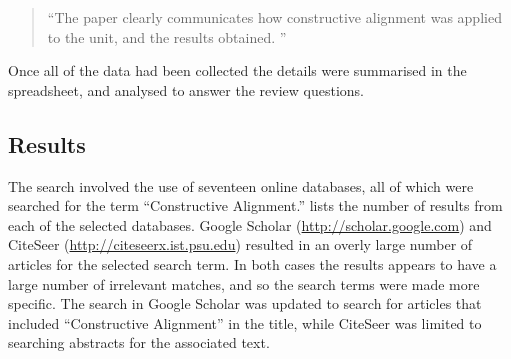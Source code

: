 \begin{quote}
``The paper clearly communicates how constructive alignment was applied to the unit, and the results obtained. ''	
\end{quote}

Once all of the data had been collected the details were summarised in the spreadsheet, and analysed to answer the review questions.



\clearpage
\subsection{Results} %
\label{sub:review_results}

The search involved the use of seventeen online databases, all of which were searched for the term ``Constructive Alignment.''  lists the number of results from each of the selected databases. Google Scholar (\url{http://scholar.google.com}) and CiteSeer (\url{http://citeseerx.ist.psu.edu}) resulted in an overly large number of articles for the selected search term. In both cases the results appears to have a large number of irrelevant matches, and so the search terms were made more specific. The search in Google Scholar was updated to search for articles that included ``Constructive Alignment'' in the title, while CiteSeer was limited to searching abstracts for the associated text.

